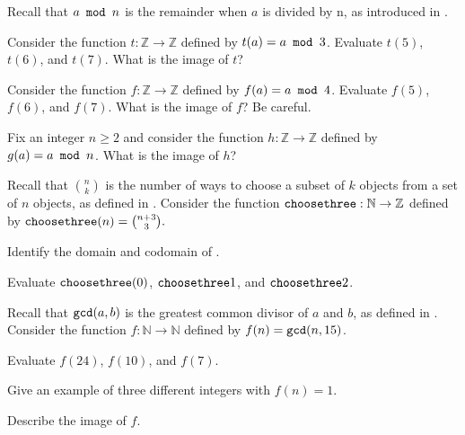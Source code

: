 \begin{exer}[\exerU] %
\label{exer_fn_modn}  
    Recall that $a \texttt{ mod } n$ is the remainder when $a$ is divided by n, as introduced in .  
        \begin{apart}
            \item Consider the function $t: \mathbb{Z} \to \mathbb{Z}$ defined by $t(a) = a \texttt{ mod } 3$.  Evaluate $t(5)$, $t(6)$, and $t(7)$.  What is the image of $t$?
            \item Consider the function $f: \mathbb{Z} \to \mathbb{Z}$ defined by $f(a) = a \texttt{ mod } 4$.  Evaluate $f(5)$, $f(6)$, and $f(7)$.  What is the image of $f$? Be careful.
            \item Fix an integer $n \ge 2$ and consider the function $h: \mathbb{Z} \to \mathbb{Z}$ defined by $g(a) = a \texttt{ mod } n$.  What is the image of $h$? 
        \end{apart}
\end{exer}

\begin{exer}[\exerU] %
\label{exer_fn_nchoose3}
    Recall that $\binom{n}{k}$ is the number of ways to choose a subset of $k$ objects from a set of $n$ objects, as defined in . Consider the function    
    $\texttt{choosethree}: \mathbb{N} \to \mathbb{Z}$ defined by $\texttt{choosethree}(n) = \binom{n+3}{3}.$
        \begin{exerpart}
            \item Identify the domain and codomain of .
            \item Evaluate $\texttt{choosethree}(0)$, $\texttt{choosethree}{1}$, and
            $\texttt{choosethree}{2}$.
        \end{exerpart}
\end{exer}

\begin{exer} [\exerU] %
\label{exer_fn_gcd15}
    Recall that $\texttt{gcd}(a,b)$ is the greatest common divisor of $a$ and $b$, as defined in . Consider the function $f: \mathbb{N} \to \mathbb{N}$ defined by $f(n) = \texttt{gcd}(n,15)$.  
        \begin{exerpart}
            \item Evaluate $f(24)$, $f(10)$, and $f(7)$.
            \item Give an example of three different integers with $f(n) = 1$.
            \item Describe the image of $f$.
        \end{exerpart}
\end{exer}

